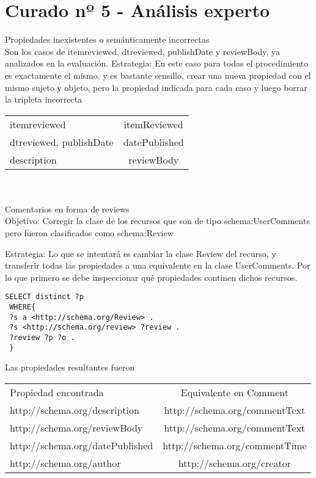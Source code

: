 \section{Curado nº 5 - Análisis experto}
\label{section:curado-analisis}
Propiedades inexistentes o semánticamente incorrectas\\
Son los casos de itemreviewed, dtreviewed, publishDate y reviewBody, ya analizados en la evaluación.
Estrategia: En este caso para todas el procedimiento es exactamente el mismo, y es bastante sensillo, crear una nueva propiedad con 
el mismo sujeto y objeto, pero la propiedad indicada para cada caso y luego borrar la tripleta incorrecta\\
\begin{tabular}{| l | c |}
 itemreviewed & itemReviewed\\
 dtreviewed, publishDate & datePublished\\
 description & reviewBody
\end{tabular}\\
\\

Comentarios en forma de reviews\\
Objetivo:
Corregir la clase de los recursos que son de tipo schema:UserComments pero fueron clasificados como schema:Review

Estrategia: 
Lo que se intentará es cambiar la clase Review del recurso, y transferir todas las propiedades a una equivalente en la clase UserComments.
Por lo que primero se debe inspeccionar qué propiedades continen dichos recursos.

\begin{lstlisting}[frame=single]
 SELECT distinct ?p
 WHERE{
 ?s a <http://schema.org/Review> .
 ?s <http://schema.org/review> ?review .
 ?review ?p ?o .
 }
\end{lstlisting}
Las propiedades resultantes fueron\\
\begin{tabular}{| l | c |}
Propiedad encontrada & Equivalente en Comment\\
http://schema.org/description & http://schema.org/commentText \\
http://schema.org/reviewBody & http://schema.org/commentText \\
http://schema.org/datePublished & http://schema.org/commentTime \\
http://schema.org/author & http://schema.org/creator
\end{tabular}

